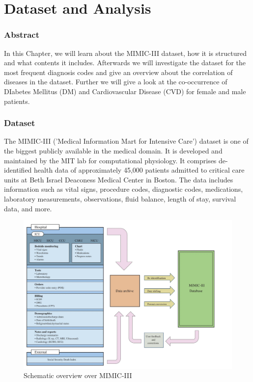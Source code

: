 \documentclass[11pt, a4paper]{book}
\begin{document}
\chapter{Dataset and Analysis}
\subsection{Abstract}
In this Chapter, we will learn about the MIMIC-III dataset, how it is structured and what contents it includes. Afterwards we will investigate the dataset for the most frequent diagnosis codes and give an overview about the correlation of diseases in the dataset. Further we will give a look at the co-occurrence  of DIabetes Mellitus (DM) and Cardiovascular Disease (CVD) for female and male patients.

\subsection{Dataset}
The MIMIC-III ('Medical Information Mart for Intensive Care') dataset is one of the biggest publicly available in the medical domain. It is developed and maintained by the MIT lab for computational physiology. It comprises de-identified health data of approximately 45,000 patients admitted to critical care units at Beth Israel Deaconess Medical Center in Boston. The data includes information such as vital signs, procedure codes, diagnostic codes, medications, laboratory measurements, observations, fluid balance, length of stay, survival data, and more. 
\begin{figure}
  \begin{center}
  \includegraphics[width=1\textwidth]{img/mimicIII-schema.png}
  \caption{Schematic overview over MIMIC-III \cite{NAT}}
  \label{fig:mimic-III-schema}
  \end{center}
\end{figure}
\end{document}
